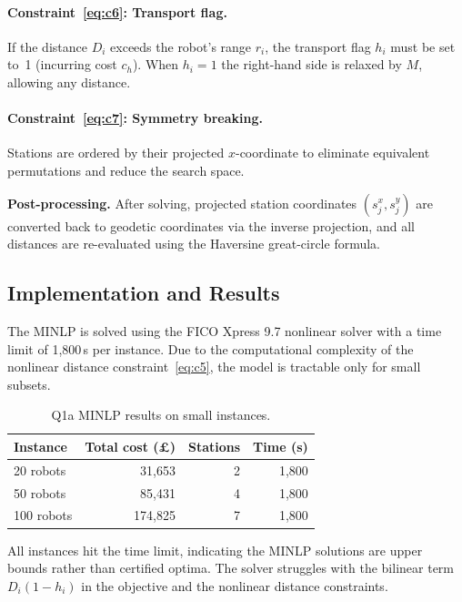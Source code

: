 \documentclass[11pt,a4paper]{article}
\begin{document}
\paragraph{Constraint~\eqref{eq:c6}: Transport flag.}
If the distance $D_i$ exceeds the robot's range $r_i$, the transport flag $h_i$ must be set to~1 (incurring cost $c_h$).
When $h_i = 1$ the right-hand side is relaxed by $M$, allowing any distance.

\paragraph{Constraint~\eqref{eq:c7}: Symmetry breaking.}
Stations are ordered by their projected $x$-coordinate to eliminate equivalent permutations and reduce the search space.

\medskip
\noindent
\textbf{Post-processing.}
After solving, projected station coordinates $(s_j^x, s_j^y)$ are converted back to geodetic coordinates via the inverse projection, and all distances are re-evaluated using the Haversine great-circle formula.

\subsection{Implementation and Results}

The MINLP is solved using the FICO Xpress 9.7 nonlinear solver with a time limit of 1,800\,s per instance.
Due to the computational complexity of the nonlinear distance constraint~\eqref{eq:c5}, the model is tractable only for small subsets.

\begin{table}[H]
\centering
\caption{Q1a MINLP results on small instances.}
\label{tab:q1a}
\begin{tabular}{lrrr}
\toprule
Instance & Total cost (\pounds) & Stations & Time (s) \\
\midrule
20 robots  & 31,653  & 2 & 1,800 \\
50 robots  & 85,431  & 4 & 1,800 \\
100 robots & 174,825 & 7 & 1,800 \\
\bottomrule
\end{tabular}
\end{table}

\noindent
All instances hit the time limit, indicating the MINLP solutions are upper bounds rather than certified optima.
The solver struggles with the bilinear term $D_i(1-h_i)$ in the objective and the nonlinear distance constraints.
\end{document}
